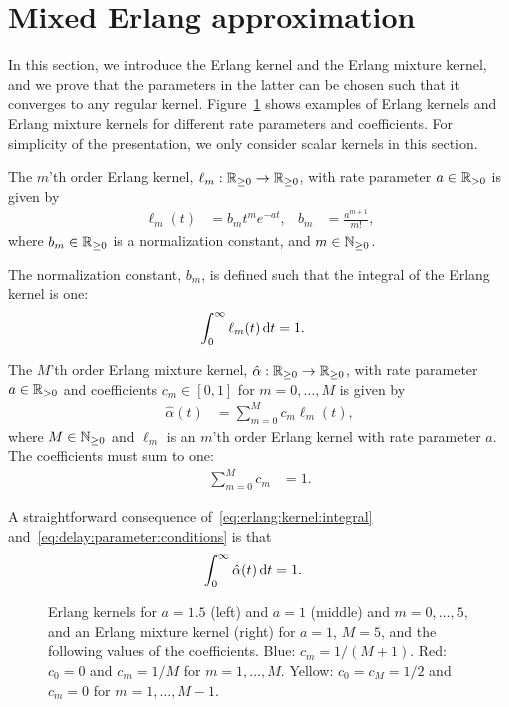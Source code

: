 \section{Mixed Erlang approximation}\label{sec:approx}
In this section, we introduce the Erlang kernel and the Erlang mixture kernel, and we prove that the parameters in the latter can be chosen such that it converges to any regular kernel. Figure~\ref{fig:erlang:kernels} shows examples of Erlang kernels and Erlang mixture kernels for different rate parameters and coefficients. For simplicity of the presentation, we only consider scalar kernels in this section.
%
\begin{definition}\label{def:erlang:kernel}
	The $m$'th order Erlang kernel,
	$\ell_m: \mathbb{R}_{\geq 0} \rightarrow \mathbb{R}_{\geq 0}$, with rate parameter $a \in \mathbb{R}_{> 0}$ is given by~\cite{Ibe:2014}
	\begin{align}\label{eq:erlang:pdf}
		\ell_m(t) &= b_m t^m e^{-a t}, &
		b_m &= \frac{a^{m+1}}{m!},
	\end{align}
	where $b_m \in \mathbb{R}_{\geq 0}$ is a normalization constant, and $m \in \mathbb{N}_{\geq 0}$.
\end{definition}
%
The normalization constant, $b_m$, is defined such that the integral of the Erlang kernel is one:
%
\begin{align}\label{eq:erlang:kernel:integral}
	\int_0^\infty \ell_m(t) \,\mathrm{d} t &= 1.
\end{align}
%
\begin{definition}\label{def:erlang:mixture:kernel}
	The $M$'th order Erlang mixture kernel, $\hat \alpha: \mathbb{R}_{\geq 0} \rightarrow \mathbb{R}_{\geq 0}$, with rate parameter $a \in \mathbb{R}_{> 0}$ and coefficients $c_m \in [0, 1]$ for $m = 0, \ldots, M$ is given by
	\begin{align}\label{eq:kernel:approximation}
		\hat \alpha(t) &= \sum_{m=0}^M c_m \ell_m(t),
	\end{align}
	where $M \in \mathbb{N}_{\geq 0}$ and $\ell_m$ is an $m$'th order Erlang kernel with rate parameter $a$. The coefficients must sum to one:
	\begin{align}\label{eq:delay:parameter:conditions}
		\sum_{m=0}^M c_m &= 1.
	\end{align}
\end{definition}
%
A straightforward consequence of~\eqref{eq:erlang:kernel:integral} and~\eqref{eq:delay:parameter:conditions} is that
%
\begin{align}
	\int_0^\infty \hat \alpha(t) \,\mathrm{d} t &= 1.
\end{align}
%
\begin{figure}[t]
	\centering
	\caption{Erlang kernels for $a = 1.5$ (left) and $a = 1$ (middle) and $m = 0, \ldots, 5$, and an Erlang mixture kernel (right) for $a = 1$, $M = 5$, and the following values of the coefficients. Blue: $c_m = 1/(M+1)$. Red: $c_0 = 0$ and $c_m = 1/M$ for $m = 1, \ldots, M$. Yellow: $c_0 = c_M = 1/2$ and $c_m = 0$ for $m = 1, \ldots, M-1$.}
	\label{fig:erlang:kernels}
\end{figure}


